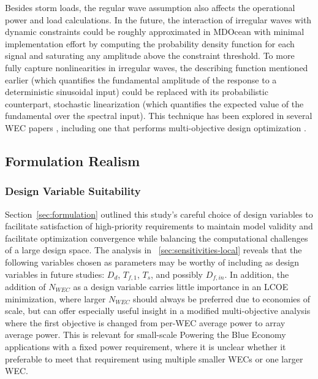 Besides storm loads, the regular wave assumption also affects the operational power and load calculations.
In the future, the interaction of irregular waves with dynamic constraints could be roughly approximated in MDOcean with minimal implementation effort by computing the probability density function for each signal and saturating any amplitude above the constraint threshold.
To more fully capture nonlinearities in irregular waves, the describing function mentioned earlier (which quantifies the fundamental amplitude of the response to a deterministic sinusoidal input) could be replaced with its probabilistic counterpart, stochastic linearization (which quantifies the expected value of the fundamental over the spectral input).
This technique has been explored in several WEC papers \cite{da_silva_statistical_2020,da_silva_stochastic_2023,kluger_synergistic_2017,folley_spectral-domain_2016,spanos_efficient_2016}, including one that performs multi-objective design optimization \cite{neshat_enhancing_2024}.


\subsection{Formulation Realism}
\subsubsection{Design Variable Suitability}
Section~\ref{sec:formulation} outlined this study's careful choice of design variables to facilitate satisfaction of high-priority requirements to maintain model validity and facilitate optimization convergence while balancing the computational challenges of a large design space.
The analysis in \sectionautorefname~\ref{sec:sensitivities-local} reveals that the following variables chosen as parameters may be worthy of including as design variables in future studies: $D_d$, $T_{f,1}$, $T_s$, and possibly $D_{f,in}$.
In addition, the addition of $N_{WEC}$ as a design variable carries little importance in an LCOE minimization, where larger $N_{WEC}$ should always be preferred due to economies of scale, but can offer especially useful insight in a modified multi-objective analysis where the first objective is changed from per-WEC average power to array average power.
This is relevant for small-scale Powering the Blue Economy applications with a fixed power requirement, where it is unclear whether it preferable to meet that requirement using multiple smaller WECs or one larger WEC.

